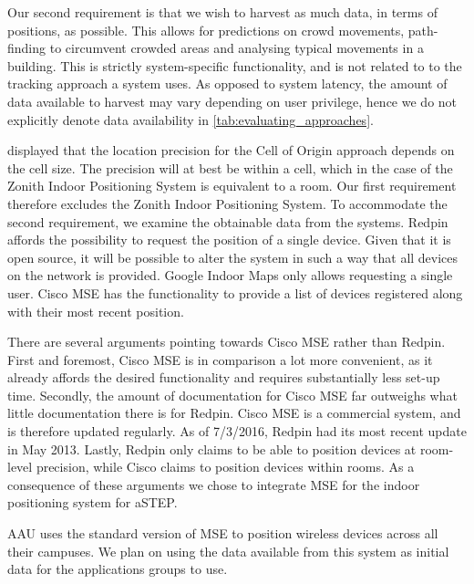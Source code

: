 Our second requirement is that we wish to harvest as much data, in terms of positions, as possible. This allows for predictions on crowd movements, path-finding to circumvent crowded areas and analysing typical movements in a building. This is strictly system-specific functionality, and is not related to to the tracking approach a system uses. As opposed to system latency, the amount of data available to harvest may vary depending on user privilege, hence we do not explicitly denote data availability in \cref{tab:evaluating_approaches}.

 displayed that the location precision for the Cell of Origin approach depends on the cell size. The precision will at best be within a cell, which in the case of the Zonith Indoor Positioning System is equivalent to a room. Our first requirement therefore excludes the Zonith Indoor Positioning System. To accommodate the second requirement, we examine the obtainable data from the systems. Redpin affords the possibility to request the position of a single device. Given that it is open source, it will be possible to alter the system in such a way that all devices on the network is provided. Google Indoor Maps only allows requesting a single user. Cisco MSE has the functionality to provide a list of devices registered along with their most recent position.

There are several arguments pointing towards Cisco MSE rather than Redpin. First and foremost, Cisco MSE is in comparison a lot more convenient, as it already affords the desired functionality and requires substantially less set-up time. Secondly, the amount of documentation for Cisco MSE far outweighs what little documentation there is for Redpin. Cisco MSE is a commercial system, and is therefore updated regularly. As of 7/3/2016, Redpin had its most recent update in May 2013. Lastly, Redpin only claims to be able to position devices at room-level precision, while Cisco claims to position devices within rooms. As a consequence of these arguments we chose to integrate MSE for the indoor positioning system for aSTEP.

AAU uses the standard version of MSE to position wireless devices across all their campuses. We plan on using the data available from this system as initial data for the applications groups to use.